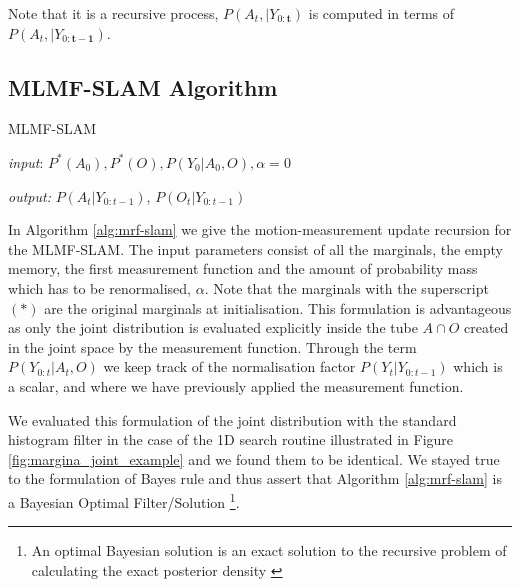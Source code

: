 \documentclass[review]{elsarticle}
\numberwithin{equation}{section}
\begin{document}
Note that it is a recursive process, $P(A_t,|Y_{0:\mathbf{t}})$ is computed in terms of  $P(A_t,|Y_{0:\mathbf{t-1}})$.

\subsection{MLMF-SLAM Algorithm}

\begin{algorithm}
\caption{MLMF-SLAM}
\textit{input}: $P^{*}(A_0), P^{*}(O), P(Y_0|A_0,O), \alpha=0$
 \begin{algorithmic}[1]
    
    
    
\end{algorithmic} \label{alg:mrf-slam}
\textit{output:} $P(A_t|Y_{0:t-1})$, $P(O_t|Y_{0:t-1})$ 
\end{algorithm}

In Algorithm \ref{alg:mrf-slam} we give the motion-measurement update recursion for the MLMF-SLAM. The input parameters consist 
of all the marginals, the empty memory, the first measurement function and the amount of probability mass which has to be renormalised, $\alpha$. 
Note that the marginals with the superscript $(*)$ are the original marginals at initialisation. 
This formulation is advantageous as only the joint distribution is evaluated explicitly inside the tube 
$A\cap O$ created in the joint space by the measurement function. Through the term $P(Y_{0:t}|A_t,O)$ we keep track of the normalisation factor $P(Y_t|Y_{0:t-1})$ which 
is a scalar, and where we have previously applied the measurement function. 

We evaluated this formulation of the joint distribution with the standard histogram filter in the case of the 1D search routine 
illustrated in Figure \ref{fig:margina_joint_example} and we found them to be identical. We stayed true to the formulation of Bayes rule 
and thus assert that Algorithm \ref{alg:mrf-slam} is a Bayesian Optimal Filter/Solution
\footnote{An optimal Bayesian solution is an exact solution to the recursive problem of calculating the exact posterior density 
\cite{PF_tutorial_2002}}.
\end{document}
